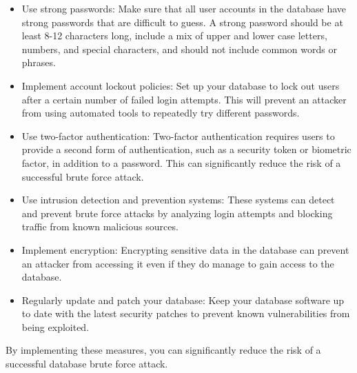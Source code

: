 \documentclass[11pt]{article}
\begin{document}
\begin{itemize}
\item Use strong passwords: Make sure that all user accounts in the database have strong passwords that are difficult to guess. A strong password should be at least 8-12 characters long, include a mix of upper and lower case letters, numbers, and special characters, and should not include common words or phrases.\\

\item Implement account lockout policies: Set up your database to lock out users after a certain number of failed login attempts. This will prevent an attacker from using automated tools to repeatedly try different passwords.\\

\item Use two-factor authentication: Two-factor authentication requires users to provide a second form of authentication, such as a security token or biometric factor, in addition to a password. This can significantly reduce the risk of a successful brute force attack.\\

\item Use intrusion detection and prevention systems: These systems can detect and prevent brute force attacks by analyzing login attempts and blocking traffic from known malicious sources.\\

\item Implement encryption: Encrypting sensitive data in the database can prevent an attacker from accessing it even if they do manage to gain access to the database.\\

\item Regularly update and patch your database: Keep your database software up to date with the latest security patches to prevent known vulnerabilities from being exploited.\\
\end{itemize}

By implementing these measures, you can significantly reduce the risk of a successful database brute force attack.\\
\end{document}
